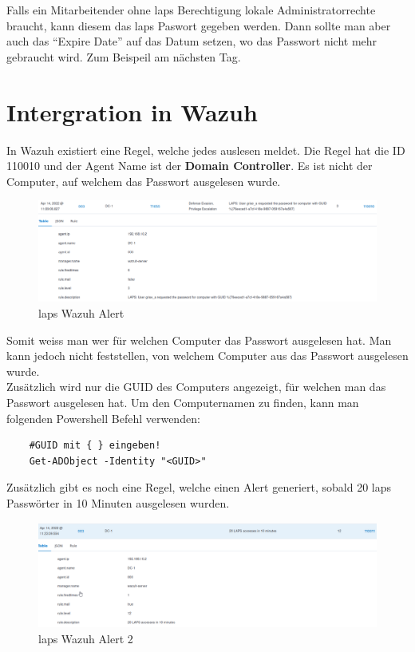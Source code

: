 Falls ein Mitarbeitender ohne \acrshort{laps} Berechtigung lokale Administratorrechte braucht, kann diesem das \acrshort{laps} Paswort gegeben werden.
Dann sollte man aber auch das ``Expire Date'' auf das Datum setzen, wo das Passwort nicht mehr gebraucht wird.
Zum Beispeil am nächsten Tag.

\section{Intergration in Wazuh}
In Wazuh existiert eine Regel, welche jedes auslesen meldet.
Die Regel hat die ID 110010 und der Agent Name ist der \textbf{Domain Controller}.
Es ist nicht der Computer, auf welchem das Passwort ausgelesen wurde.
\begin{figure}[H]
    \centering
    \includegraphics[width=\linewidth]{../img/LAPS/laps-wazuh.png}
    \caption{\acrshort{laps} Wazuh Alert}
\end{figure}
Somit weiss man wer für welchen Computer das Passwort ausgelesen hat.
Man kann jedoch nicht feststellen, von welchem Computer aus das Passwort ausgelesen wurde.\\

Zusätzlich wird nur die GUID des Computers angezeigt, für welchen man das Passwort ausgelesen hat.
Um den Computernamen zu finden, kann man folgenden Powershell Befehl verwenden:
\begin{lstlisting}
    #GUID mit { } eingeben!
    Get-ADObject -Identity "<GUID>"
\end{lstlisting}

Zusätzlich gibt es noch eine Regel, welche einen Alert generiert, sobald 20 \acrshort{laps} Passwörter in 10 Minuten ausgelesen wurden.
\begin{figure}[H]
    \centering
    \includegraphics[width=\linewidth]{../img/LAPS/laps-wazuh-alert.png}
    \caption{\acrshort{laps} Wazuh Alert 2}
\end{figure}